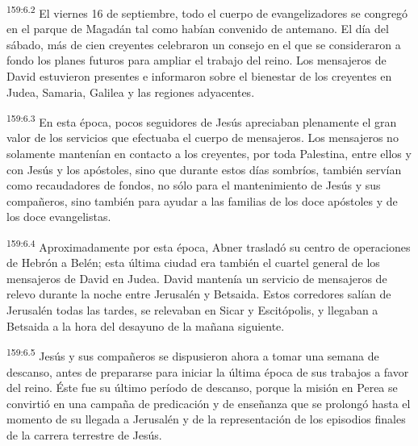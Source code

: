 \par 
\textsuperscript{159:6.2} El viernes 16 de septiembre, todo el cuerpo de evangelizadores se congregó en el parque de Magadán tal como habían convenido de antemano. El día del sábado, más de cien creyentes celebraron un consejo en el que se consideraron a fondo los planes futuros para ampliar el trabajo del reino. Los mensajeros de David estuvieron presentes e informaron sobre el bienestar de los creyentes en Judea, Samaria, Galilea y las regiones adyacentes.

\par 
\textsuperscript{159:6.3} En esta época, pocos seguidores de Jesús apreciaban plenamente el gran valor de los servicios que efectuaba el cuerpo de mensajeros. Los mensajeros no solamente mantenían en contacto a los creyentes, por toda Palestina, entre ellos y con Jesús y los apóstoles, sino que durante estos días sombríos, también servían como recaudadores de fondos, no sólo para el mantenimiento de Jesús y sus compañeros, sino también para ayudar a las familias de los doce apóstoles y de los doce evangelistas.

\par 
\textsuperscript{159:6.4} Aproximadamente por esta época, Abner trasladó su centro de operaciones de Hebrón a Belén; esta última ciudad era también el cuartel general de los mensajeros de David en Judea. David mantenía un servicio de mensajeros de relevo durante la noche entre Jerusalén y Betsaida. Estos corredores salían de Jerusalén todas las tardes, se relevaban en Sicar y Escitópolis, y llegaban a Betsaida a la hora del desayuno de la mañana siguiente.

\par 
\textsuperscript{159:6.5} Jesús y sus compañeros se dispusieron ahora a tomar una semana de descanso, antes de prepararse para iniciar la última época de sus trabajos a favor del reino. Éste fue su último período de descanso, porque la misión en Perea se convirtió en una campaña de predicación y de enseñanza que se prolongó hasta el momento de su llegada a Jerusalén y de la representación de los episodios finales de la carrera terrestre de Jesús.